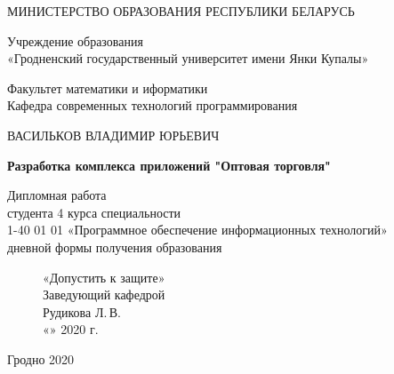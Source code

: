 \begin{titlepage}
    \begin{center}
        МИНИСТЕРСТВО ОБРАЗОВАНИЯ РЕСПУБЛИКИ БЕЛАРУСЬ

        \vspace{0.5cm}

        Учреждение образования \\
        «Гродненский государственный университет имени Янки Купалы»
        \vspace{0.5cm}

        Факультет математики и иформатики \\
        Кафедра современных технологий программирования

        \vfill

        ВАСИЛЬКОВ ВЛАДИМИР ЮРЬЕВИЧ
        \vfill

        {\large\textbf{
            Разработка комплекса приложений "Оптовая торговля"
        }}

        \vfill

        Дипломная работа \\
        студента 4 курса специальности\\
        1-40 01 01 «Программное обеспечение информационных технологий»\\
        дневной формы получения образования

        \bigskip
    \end{center}
    \vfill

    \newlength{\ML}
    \begin{figure}[!htb]
        \centering
        \begin{minipage}{.5\textwidth}
            «Допустить к защите»\\
            Заведующий кафедрой\\
            \underline{\hspace{\ML}} Рудикова Л.\,В.\\
            «\underline{\hspace{0.7cm}}» \underline{\hspace{2cm}} 2020 г.
        \end{minipage}%
        \begin{minipage}[c]{0.5\textwidth}
        \end{minipage}%
    \end{figure}

    \vfill

    \begin{center}
        Гродно 2020
    \end{center}
\end{titlepage}